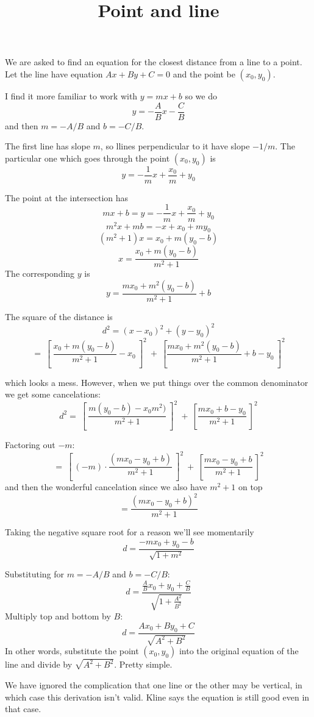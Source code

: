 \documentclass[11pt, oneside]{article}
\title{Point and line}
\date{}
\begin{document}
\maketitle
\Large


We are asked to find an equation for the closest distance from a line to a point.  Let the line have equation $Ax + By + C = 0$ and the point be $(x_0,y_0)$.

I find it more familiar to work with $y = mx + b$ so we do
\[ y = -\frac{A}{B}x - \frac{C}{B} \]
and then $m = -A/B$ and $b = -C/B$.

The first line has slope $m$, so llines perpendicular to it have slope $-1/m$. The particular one which goes through the point $(x_0,y_0)$ is
\[ y = -\frac{1}{m} x + \frac{x_0}{m} + y_0 \]

The point at the intersection has
\[ mx + b = y = -\frac{1}{m} x + \frac{x_0}{m} + y_0 \]
\[ m^2x + mb = - x + x_0 + my_0 \]
\[ (m^2 + 1)x = x_0 + m(y_0  - b)\]
\[ x = \frac{x_0 + m(y_0  - b)}{m^2 + 1} \]
The corresponding $y$ is
\[ y = \frac{mx_0 + m^2(y_0  - b)}{m^2 + 1} + b \]

The square of the distance is
\[ d^2 = (x - x_0)^2 + (y - y_0)^2 \]
\[ = \ [ \ \frac{x_0 + m(y_0  - b)}{m^2 + 1} - x_0 \ ]^2 \ + \ [ \frac{mx_0 + m^2(y_0  - b)}{m^2 + 1} + b - y_0 \ ]^2 \]

which looks a mess.  However, when we put things over the common denominator we get some cancelations:
\[ d^2 = \ [ \ \frac{m(y_0  - b) - x_0m^2)}{m^2 + 1} \ ]^2 \ + \ [ \frac{mx_0 + b - y_0}{m^2 + 1} \ ]^2 \]

Factoring out $-m$:
\[ = \ [ \ (-m) \cdot \frac{( mx_0 - y_0  + b)}{m^2 + 1} \ ]^2 \ + \ [ \frac{mx_0 - y_0 + b}{m^2 + 1} \ ]^2 \]
and then the wonderful cancelation since we also have $m^2 + 1$ on top
\[ = \frac{(mx_0 - y_0  + b)^2}{m^2 + 1} \]

Taking the negative square root for a reason we'll see momentarily
\[ d = \frac{-mx_0 + y_0  - b}{\sqrt{1 + m^2}} \]

Substituting for $m = -A/B$ and $b = -C/B$:
\[ d = \frac{\frac{A}{B} x_0 + y_0  + \frac{C}{B}}{\sqrt{1 + \frac{A^2}{B^2}}} \]
Multiply top and bottom by $B$:
\[ d = \frac{Ax_0 + By_0 + C}{\sqrt{A^2 + B^2}} \]
In other words, substitute the point $(x_0,y_0)$ into the original equation of the line and divide by $\sqrt{A^2 + B^2}$.  Pretty simple.

We have ignored the complication that one line or the other may be vertical, in which case this derivation isn't valid.  Kline says the equation is still good even in that case.
\end{document}

